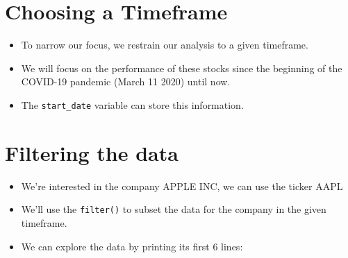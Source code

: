 \documentclass[
  12pt]{article}
\providecommand{\tightlist}{%
  \setlength{\itemsep}{0pt}\setlength{\parskip}{0pt}}\usepackage{longtable,booktabs,array}
\theoremstyle{definition}
\theoremstyle{remark}
\begin{document}
\section{Choosing a Timeframe}

\begin{itemize}
\item
  To narrow our focus, we restrain our analysis to a given timeframe.
\item
  We will focus on the performance of these stocks since the beginning
  of the COVID-19 pandemic (March 11 2020) until now.
\item
  The \texttt{start\_date} variable can store this information.
\end{itemize}

\section{Filtering the data}

\begin{itemize}
\item
  We're interested in the company APPLE INC, we can use the ticker AAPL
\item
  We'll use the \texttt{filter()} to subset the data for the company in
  the given timeframe.
\end{itemize}

\begin{itemize}
\tightlist
\item
  We can explore the data by printing its first 6 lines:
\end{itemize}
\end{document}
